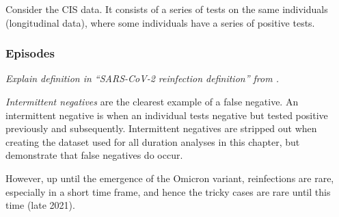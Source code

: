 \documentclass[thesis.tex]{subfiles}
\begin{document}
Consider the CIS data.
It consists of a series of tests on the same individuals (longitudinal data), where some individuals have a series of positive tests.

\subsubsection{Episodes}

\emph{Explain definition in ``SARS-CoV-2 reinfection definition'' from \textcite{weiRisk}.}

\emph{Intermittent negatives} are the clearest example of a false negative.
An intermittent negative is when an individual tests negative but tested positive previously and subsequently.
Intermittent negatives are stripped out when creating the dataset used for all duration analyses in this chapter, but demonstrate that false negatives do occur.

However, up until the emergence of the Omicron variant, reinfections are rare, especially in a short time frame, and hence the tricky cases are rare until this time (late 2021).


\ifSubfilesClassLoaded{
  \listoftodos
}{}
\end{document}
